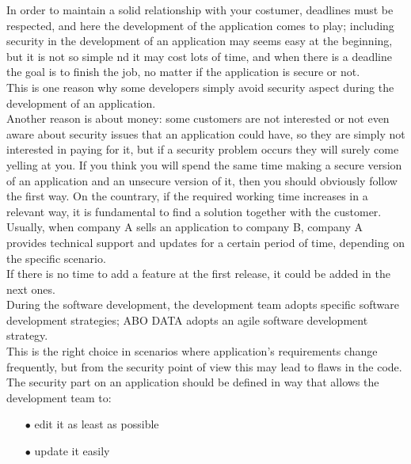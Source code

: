 \documentclass[12pt]{report}
\begin{document}
{In order to maintain a solid relationship with your costumer, deadlines must be respected, and here the development of the application comes to play; including security in the development of an application may seems easy at the beginning, but it is not so simple nd it may cost lots of time, and when there is a deadline the goal is to finish the job, no matter if the application is secure or not.\\
This is one reason why some developers simply avoid security aspect during the development of an application.\\

Another reason is about money: some customers are not interested or not even aware about security issues that an application could have, so they are simply not interested in paying for it, but if a security problem occurs they will surely come yelling at you.\newline
If you think you will spend the same time making a secure version of an application and an unsecure version of it, then you should obviously follow the first way. On the countrary, if the required working time increases in a relevant way, it is fundamental to find a solution together with the customer.\\ 

Usually, when company A sells an application to company B, company A provides technical support and updates for a certain period of time, depending on the specific scenario.\\
If there is no time to add a feature at the first release, it could be added in the next ones.\\

During the software development, the development team adopts specific software development strategies; ABO DATA adopts an agile software development strategy.\\ 
This is the right choice in scenarios where application's requirements change frequently, but from the security point of view this may lead to flaws in the code.\\

The security part on an application should be defined in way that allows the development team to:

\begin{itemize}
\setlength{\itemindent}{+4mm}
\item[$\bullet$] edit it as least as possible
\item[$\bullet$] update it easily
\end{itemize}

}
\end{document}
